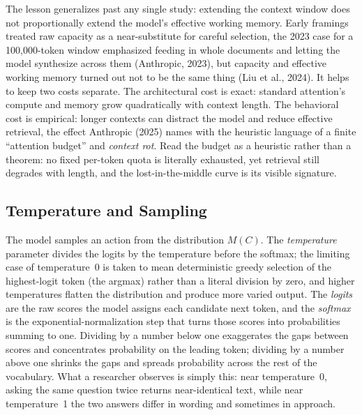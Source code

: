 The lesson generalizes past any single study: extending the context window does not proportionally extend the model's effective working memory.
Early framings treated raw capacity as a near-substitute for careful selection, the 2023 case for a 100,000-token window emphasized feeding in whole documents and letting the model synthesize across them (Anthropic, 2023), but capacity and effective working memory turned out not to be the same thing (Liu et al., 2024).
It helps to keep two costs separate.
The architectural cost is exact: standard attention's compute and memory grow quadratically with context length.
The behavioral cost is empirical: longer contexts can distract the model and reduce effective retrieval, the effect Anthropic (2025) names with the heuristic language of a finite ``attention budget'' and \emph{context rot}.
Read the budget as a heuristic rather than a theorem: no fixed per-token quota is literally exhausted, yet retrieval still degrades with length, and the lost-in-the-middle curve is its visible signature.

\subsection{Temperature and Sampling}

The model samples an action from the distribution $M(C)$.
The \emph{temperature} parameter divides the logits by the temperature before the softmax; the limiting case of temperature~0 is taken to mean deterministic greedy selection of the highest-logit token (the argmax) rather than a literal division by zero, and higher temperatures flatten the distribution and produce more varied output.
The \emph{logits} are the raw scores the model assigns each candidate next token, and the \emph{softmax} is the exponential-normalization step that turns those scores into probabilities summing to one.
Dividing by a number below one exaggerates the gaps between scores and concentrates probability on the leading token; dividing by a number above one shrinks the gaps and spreads probability across the rest of the vocabulary.
What a researcher observes is simply this: near temperature~0, asking the same question twice returns near-identical text, while near temperature~1 the two answers differ in wording and sometimes in approach.

